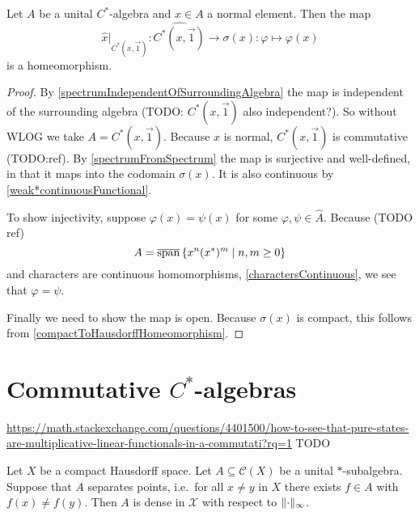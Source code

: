 \begin{proposition} \label{generatedAlgebraSpectrumHomeomorphism}
Let $A$ be a unital $C^*$-algebra and $x\in A$ a normal element. Then the map
\[ \hat{x}|_{\widehat{C^*(x,\vec{1})}}: \widehat{C^*(x,\vec{1})}\to \sigma(x): \varphi \mapsto \varphi(x) \]
is a homeomorphism.
\end{proposition}
\begin{proof}
By \ref{spectrumIndependentOfSurroundingAlgebra} the map is independent of the surrounding algebra (TODO: $C^*(x,\vec{1})$ also independent?). So without WLOG we take $A = C^*(x,\vec{1})$. Because $x$ is normal, $C^*(x,\vec{1})$ is commutative (TODO:ref). By \ref{spectrumFromSpectrum} the map is surjective and well-defined, in that it maps into the codomain $\sigma(x)$. It is also continuous by \ref{weak*continuousFunctional}.

To show injectivity, suppose $\varphi(x) = \psi(x)$ for some $\varphi,\psi\in\hat{A}$. Because (TODO ref)
\[ A = \overline{\operatorname{span}}\left\{ x^n(x^*)^m \;\middle|\; n,m\geq 0 \right\} \]
and characters are continuous homomorphisms, \ref{charactersContinuous}, we see that $\varphi = \psi$.

Finally we need to show the map is open. Because $\sigma(x)$ is compact, this follows from \ref{compactToHausdorffHomeomorphism}.
\end{proof}

\section{Commutative $C^*$-algebras}
\url{https://math.stackexchange.com/questions/4401500/how-to-see-that-pure-states-are-multiplicative-linear-functionals-in-a-commutati?rq=1} TODO

\begin{theorem} \label{StoneWeierstrass}
Let $X$ be a compact Hausdorff space. Let $A\subseteq \mathcal{C}(X)$ be a unital $*$-subalgebra. Suppose that $A$ separates points, i.e.\ for all $x\neq y$ in $X$ there exists $f\in A$ with $f(x) \neq f(y)$. Then $A$ is dense in $\mathcal{X}$ with respect to $\lVert\cdot\rVert_\infty$.
\end{theorem}

